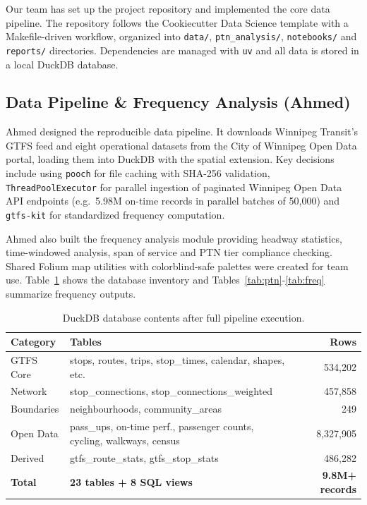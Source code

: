 \documentclass[11pt]{article}
\begin{document}
Our team has set up the project repository and implemented the core data pipeline. The repository follows the Cookiecutter Data Science template with a Makefile-driven workflow, organized into \texttt{data/}, \texttt{ptn\_analysis/}, \texttt{notebooks/} and \texttt{reports/} directories. Dependencies are managed with \texttt{uv} and all data is stored in a local DuckDB database.

\subsection{Data Pipeline \& Frequency Analysis (Ahmed)}

Ahmed designed the reproducible data pipeline. It downloads Winnipeg Transit's GTFS feed and eight operational datasets from the City of Winnipeg Open Data portal, loading them into DuckDB with the spatial extension. Key decisions include using \texttt{pooch} for file caching with SHA-256 validation, \texttt{ThreadPoolExecutor} for parallel ingestion of paginated Winnipeg Open Data API endpoints (e.g.\ 5.98M on-time records in parallel batches of 50{,}000) and \texttt{gtfs-kit} for standardized frequency computation.

Ahmed also built the frequency analysis module providing headway statistics, time-windowed analysis, span of service and PTN tier compliance checking. Shared Folium map utilities with colorblind-safe palettes were created for team use. Table~\ref{tab:db} shows the database inventory and Tables~\ref{tab:ptn}-\ref{tab:freq} summarize frequency outputs.

\begin{table}[H]
\centering
\footnotesize
\renewcommand{\arraystretch}{1.05}
\begin{tabular}{l l r}
\toprule
\textbf{Category} & \textbf{Tables} & \textbf{Rows} \\
\midrule
GTFS Core & stops, routes, trips, stop\_times, calendar, shapes, etc. & 534{,}202 \\
Network & stop\_connections, stop\_connections\_weighted & 457{,}858 \\
Boundaries & neighbourhoods, community\_areas & 249 \\
Open Data & pass\_ups, on-time perf., passenger counts, cycling, walkways, census & 8{,}327{,}905 \\
Derived & gtfs\_route\_stats, gtfs\_stop\_stats & 486{,}282 \\
\midrule
\textbf{Total} & \textbf{23 tables + 8 SQL views} & \textbf{9.8M+ records} \\
\bottomrule
\end{tabular}
\caption{DuckDB database contents after full pipeline execution.}
\label{tab:db}
\end{table}
\end{document}
